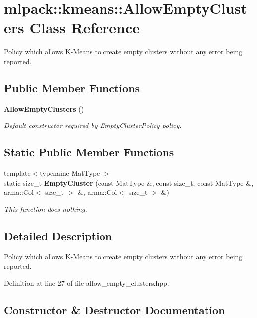 \section{mlpack\-:\-:kmeans\-:\-:Allow\-Empty\-Clusters Class Reference}
\label{classmlpack_1_1kmeans_1_1AllowEmptyClusters}


Policy which allows K-\/\-Means to create empty clusters without any error being reported.  


\subsection*{Public Member Functions}
\begin{DoxyCompactItemize}
\item 
{\bf Allow\-Empty\-Clusters} ()
\begin{DoxyCompactList}\small\item\em Default constructor required by Empty\-Cluster\-Policy policy. \end{DoxyCompactList}\end{DoxyCompactItemize}
\subsection*{Static Public Member Functions}
\begin{DoxyCompactItemize}
\item 
{\footnotesize template$<$typename Mat\-Type $>$ }\\static size\-\_\-t {\bf Empty\-Cluster} (const Mat\-Type \&, const size\-\_\-t, const Mat\-Type \&, arma\-::\-Col$<$ size\-\_\-t $>$ \&, arma\-::\-Col$<$ size\-\_\-t $>$ \&)
\begin{DoxyCompactList}\small\item\em This function does nothing. \end{DoxyCompactList}\end{DoxyCompactItemize}


\subsection{Detailed Description}
Policy which allows K-\/\-Means to create empty clusters without any error being reported. 

Definition at line 27 of file allow\-\_\-empty\-\_\-clusters.\-hpp.



\subsection{Constructor \& Destructor Documentation}
